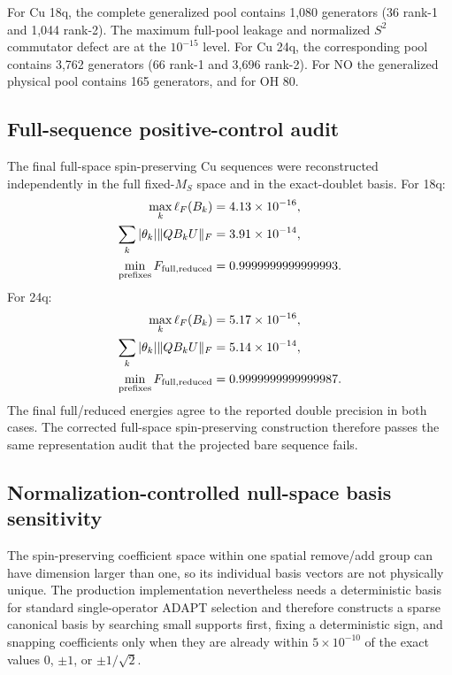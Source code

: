 \documentclass[
 aip,
 jcp,
 amsmath,amssymb,
 preprint
]{revtex4-2}
\begin{document}
For Cu 18q, the complete generalized pool contains 1,080 generators (36 rank-1 and 1,044 rank-2).
The maximum full-pool leakage and normalized $S^2$ commutator defect are at the $10^{-15}$ level.
For Cu 24q, the corresponding pool contains 3,762 generators (66 rank-1 and 3,696 rank-2).
For NO the generalized physical pool contains 165 generators, and for OH 80.

\subsection{Full-sequence positive-control audit}

The final full-space spin-preserving Cu sequences were reconstructed independently in the full fixed-$M_S$ space and in the exact-doublet basis.
For 18q:
\begin{align}
\max_k\ell_F(B_k)&=4.13\times10^{-16},\\
\sum_k|\theta_k|\|QB_kU\|_F&=3.91\times10^{-14},\\
\min_{\rm prefixes}F_{\rm full,reduced}
&=0.9999999999999993.
\end{align}
For 24q:
\begin{align}
\max_k\ell_F(B_k)&=5.17\times10^{-16},\\
\sum_k|\theta_k|\|QB_kU\|_F&=5.14\times10^{-14},\\
\min_{\rm prefixes}F_{\rm full,reduced}
&=0.9999999999999987.
\end{align}
The final full/reduced energies agree to the reported double precision in both cases.
The corrected full-space spin-preserving construction therefore passes the same representation audit that the projected bare sequence fails.

\subsection{Normalization-controlled null-space basis sensitivity}

The spin-preserving coefficient space within one spatial remove/add group can have dimension larger than one, so its individual basis vectors are not physically unique.
The production implementation nevertheless needs a deterministic basis for standard single-operator ADAPT selection and therefore constructs a sparse canonical basis by searching small supports first, fixing a deterministic sign, and snapping coefficients only when they are already within $5\times10^{-10}$ of the exact values $0$, $\pm1$, or $\pm1/\sqrt2$.
\end{document}
